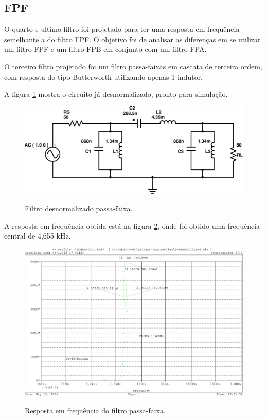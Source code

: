 \subsection{FPF}
O quarto e ultimo filtro foi projetado para ter uma resposta em frequência 
semelhante a do filtro FPF. O objetivo foi de analisar as diferenças 
em se utilizar um filtro FPF e um filtro FPB em conjunto com um filtro FPA.

O terceiro filtro projetado foi um filtro passa-faixas em cascata de terceira 
ordem, com resposta do tipo Butterworth utilizando apenas 1 indutor.

A figura \ref{fig:fpf} mostra o circuito já desnormalizado, pronto para 
simulação.

\begin{figure}[!h]
  \centering
  
  \includegraphics[scale=0.4]{Imagens/fpf}
  \label{fig:fpf}
  \caption{Filtro desnormalizado passa-faixa.}
\end{figure}

A resposta em frequência obtida está na figura \ref{fig:resp_freq_4}, onde foi 
obtido uma frequência central de 4,655 kHz. 

\begin{figure}[!h]
  \centering
  
  \includegraphics[scale=0.3]{Imagens/resp_freq_4}
  \label{fig:resp_freq_4}
  \caption{Resposta em frequência do filtro passa-faixa.}
\end{figure}

